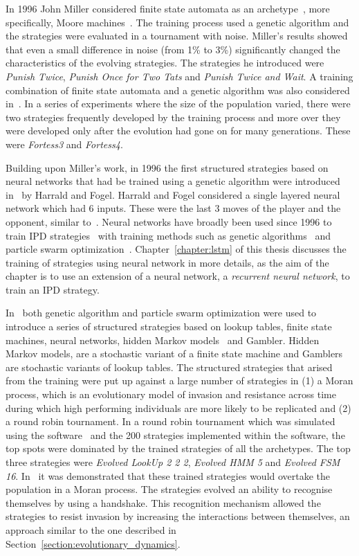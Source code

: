 In 1996 John Miller considered finite state automata as an
archetype~\cite{Miller1996}, more specifically, Moore
machines~\cite{moore1956}. The training process used a genetic algorithm and
the strategies were evaluated in a tournament with noise.
Miller's results showed that even a small
difference in noise (from 1\% to 3\%) significantly changed the characteristics
of the evolving strategies. The strategies he introduced were \textit{Punish
Twice}, \textit{Punish Once for Two Tats} and \textit{Punish Twice and Wait}.
A training combination of finite state automata and a genetic algorithm was
also considered in~\cite{Ashlock2006b}. In a series of experiments where the size of
the population varied, there were two strategies frequently developed by the
training process and more over they were developed only after the evolution had
gone on for many generations. These were \textit{Fortess3} and
\textit{Fortess4}.

Building upon Miller's work, in 1996 the first structured strategies based on
neural networks that had be trained using a genetic algorithm were introduced
in~\cite{Harrald1996} by Harrald and Fogel. Harrald and Fogel considered a
single layered neural network which had 6 inputs. These were the last 3 moves of
the player and the opponent, similar to~\cite{Axelrod1987}. Neural networks have
broadly been used since 1996 to train IPD strategies~\cite{Ashlock2006a, Chong2005,
Marks1999, Franken2005} with training methods such as genetic
algorithms~\cite{Ashlock2006a, Chong2005, Marks1999, Franken2005} and particle swarm
optimization~\cite{Franken2005}. Chapter~\ref{chapter:lstm} of this thesis discusses
the training of strategies using neural network in more details, as the aim of
the chapter is to use an extension of a neural network, a
\textit{recurrent neural network}, to train an IPD strategy.

In~\cite{Knight2017, KnightHGC17} both genetic algorithm and particle swarm
optimization were used to introduce a series of structured strategies based on
lookup tables, finite state machines, neural networks, hidden Markov
models~\cite{eddy1996} and Gambler. Hidden Markov models, are a stochastic
variant of a finite state machine and Gamblers are stochastic variants of lookup
tables. The structured strategies that arised from the training were put up
against a large number of strategies in (1) a Moran process, which is an
evolutionary model of invasion and resistance across time during which high
performing individuals are more likely to be replicated and (2)
a round robin tournament. In a round robin tournament which was simulated using the
software~\cite{axelrodproject} and the 200 strategies implemented within the
software, the top spots were dominated by the trained strategies of all the
archetypes. The top three strategies were \textit{Evolved
LookUp 2 2 2}, \textit{Evolved HMM 5} and \textit{Evolved FSM 16}.
In~\cite{KnightHGC17} it was demonstrated that these trained strategies
would overtake the population in a Moran process. The strategies evolved an ability
to recognise themselves by using a handshake. This recognition mechanism allowed the strategies
to resist invasion by increasing the interactions between themselves, an approach
similar to the one described in Section~\ref{section:evolutionary_dynamics}.

